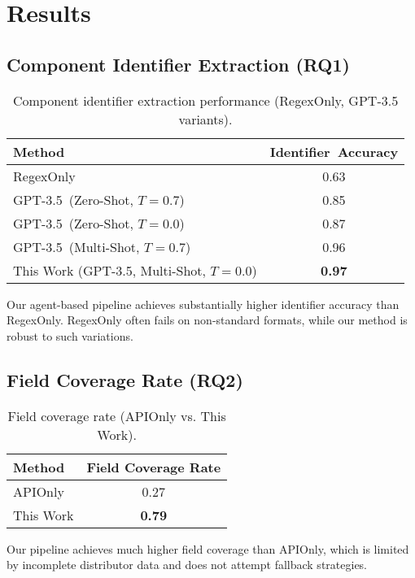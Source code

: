 \section{Results}
\subsection{Component Identifier Extraction (RQ1)}
\begin{table}[H]
\centering
\caption{Component identifier extraction performance (RegexOnly, GPT-3.5 variants).}
\label{tab:mpn}
\begin{tabular}{lc}
\toprule
Method & Identifier~Accuracy \\
\midrule
RegexOnly                        & 0.63 \\
GPT-3.5~(Zero-Shot, $T=0.7$)     & 0.85 \\
GPT-3.5~(Zero-Shot, $T=0.0$)     & 0.87 \\
GPT-3.5~(Multi-Shot, $T=0.7$)    & 0.96 \\
This Work (GPT-3.5, Multi-Shot, $T=0.0$)       & \textbf{0.97} \\
\bottomrule
\end{tabular}
\end{table}
Our agent-based pipeline achieves substantially higher identifier accuracy than RegexOnly. RegexOnly often fails on non-standard formats, while our method is robust to such variations.

\subsection{Field Coverage Rate (RQ2)}
\begin{table}[H]
\centering
\caption{Field coverage rate (APIOnly vs. This Work).}
\label{tab:coverage}
\begin{tabular}{lc}
\toprule
Method & Field Coverage Rate \\
\midrule
APIOnly   & 0.27 \\
This Work      & \textbf{0.79} \\
\bottomrule
\end{tabular}
\end{table}
Our pipeline achieves much higher field coverage than APIOnly, which is limited by incomplete distributor data and does not attempt fallback strategies.

